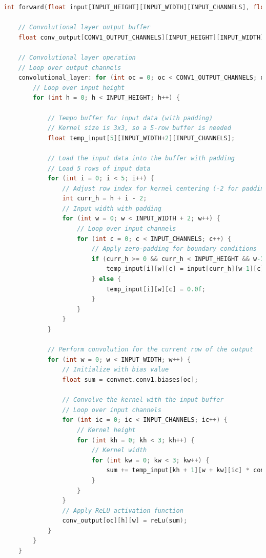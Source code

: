 \documentclass{article}
\begin{document}
\begin{lstlisting}[language=C]
int forward(float input[INPUT_HEIGHT][INPUT_WIDTH][INPUT_CHANNELS], float output[NUM_CLASSES]) {
    
    // Convolutional layer output buffer
    float conv_output[CONV1_OUTPUT_CHANNELS][INPUT_HEIGHT][INPUT_WIDTH];
    
    // Convolutional layer operation
    // Loop over output channels
    convolutional_layer: for (int oc = 0; oc < CONV1_OUTPUT_CHANNELS; oc++) {
        // Loop over input height
        for (int h = 0; h < INPUT_HEIGHT; h++) {        

            // Tempo buffer for input data (with padding)
            // Kernel size is 3x3, so a 5-row buffer is needed
            float temp_input[5][INPUT_WIDTH+2][INPUT_CHANNELS]; 
            
            // Load the input data into the buffer with padding
            // Load 5 rows of input data
            for (int i = 0; i < 5; i++) { 
                // Adjust row index for kernel centering (-2 for padding)
                int curr_h = h + i - 2;  
                // Input width with padding
                for (int w = 0; w < INPUT_WIDTH + 2; w++) { 
                    // Loop over input channels
                    for (int c = 0; c < INPUT_CHANNELS; c++) {
                        // Apply zero-padding for boundary conditions
                        if (curr_h >= 0 && curr_h < INPUT_HEIGHT && w-1 >= 0 && w-1 < INPUT_WIDTH) {
                            temp_input[i][w][c] = input[curr_h][w-1][c];
                        } else {
                            temp_input[i][w][c] = 0.0f;
                        }
                    }
                }
            }
            
            // Perform convolution for the current row of the output
            for (int w = 0; w < INPUT_WIDTH; w++) {
                // Initialize with bias value
                float sum = convnet.conv1.biases[oc]; 
                
                // Convolve the kernel with the input buffer
                // Loop over input channels
                for (int ic = 0; ic < INPUT_CHANNELS; ic++) { 
                    // Kernel height
                    for (int kh = 0; kh < 3; kh++) {      
                        // Kernel width    
                        for (int kw = 0; kw < 3; kw++) {      
                            sum += temp_input[kh + 1][w + kw][ic] * convnet.conv1.weights[oc][ic][kh][kw];
                        }
                    }
                }
                // Apply ReLU activation function
                conv_output[oc][h][w] = reLu(sum); 
            }
        }
    }


\end{lstlisting}
\end{document}
